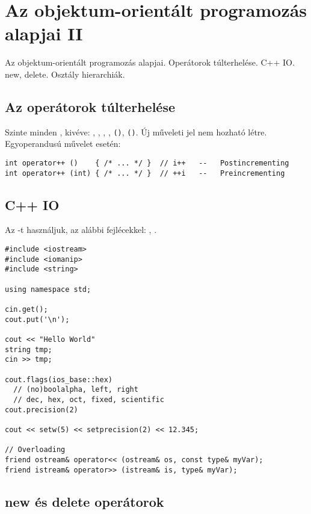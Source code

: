 \documentclass[../../main.tex]{subfiles}
\begin{document}
\section{Az objektum-orientált programozás alapjai II}

\begin{fulltheorem}
	Az objektum-orientált programozás alapjai. Operátorok túlterhelése.
	C++ IO. new, delete. Osztály hierarchiák.
\end{fulltheorem}

\subsection{Az operátorok túlterhelése}

Szinte minden  , kivéve: \tc{::}, ,
, , \texttt{()}, \texttt{()}. Új műveleti
jel nem hozható létre. Egyoperandusú művelet esetén:

\begin{verbatim}
int operator++ ()    { /* ... */ }  // i++   --   Postincrementing
int operator++ (int) { /* ... */ }  // ++i   --   Preincrementing
\end{verbatim}

\subsection{C++ IO}

Az  -t használjuk, az alábbi fejlécekkel:
, .

\begin{verbatim}
#include <iostream>
#include <iomanip>
#include <string>

using namespace std;

cin.get();
cout.put('\n');

cout << "Hello World"
string tmp;
cin >> tmp;

cout.flags(ios_base::hex)
  // (no)boolalpha, left, right
  // dec, hex, oct, fixed, scientific
cout.precision(2)

cout << setw(5) << setprecision(2) << 12.345;

// Overloading
friend ostream& operator<< (ostream& os, const type& myVar);
friend istream& operator>> (istream& is, type& myVar);
\end{verbatim}

\subsection{new és delete operátorok}
\end{document}
